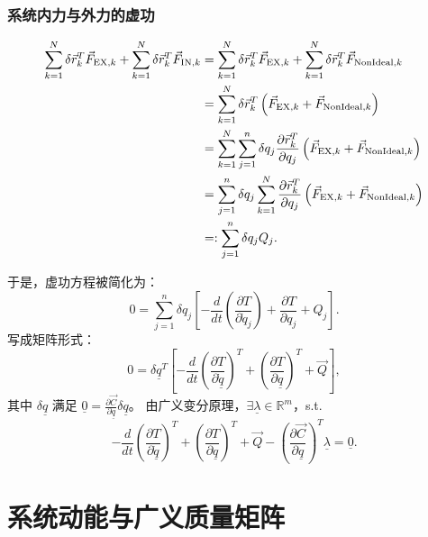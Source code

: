 \subsubsection{系统内力与外力的虚功}
\[
\begin{aligned}
\sum_{k=1}^N \delta \vec{r}_k^T \vec{F}_{{\rm EX},k} + \sum_{k=1}^N \delta \vec{r}_k^T \vec{F}_{{\rm IN},k}
&= \sum_{k=1}^N \delta \vec{r}_k^T \vec{F}_{{\rm EX},k} + \sum_{k=1}^N \delta \vec{r}_k^T \vec{F}_{{\rm NonIdeal},k} \\
&= \sum_{k=1}^N \delta \vec{r}_k^T \left( \vec{F}_{{\rm EX},k} + \vec{F}_{{\rm NonIdeal},k} \right) \\
&= \sum_{k=1}^N \sum_{j=1}^n \delta q_j \frac{\partial \vec{r}_k^T}{\partial q_j} \left( \vec{F}_{{\rm EX},k} + \vec{F}_{{\rm NonIdeal},k} \right) \\
&= \sum_{j=1}^n \delta q_j \sum_{k=1}^N \frac{\partial \vec{r}_k^T}{\partial q_j} \left( \vec{F}_{{\rm EX},k} + \vec{F}_{{\rm NonIdeal},k} \right) \\
&=: \sum_{j=1}^n \delta q_j Q_j.
\end{aligned}
\]

于是，虚功方程被简化为：
\[
0 = \sum_{j=1}^n \delta q_j \left[ -\frac{d}{dt}\left( \frac{\partial T}{\partial \dot{q}_j} \right) + \frac{\partial T}{\partial q_j} + Q_j \right].
\]
写成矩阵形式：
\[
0 = \delta \underline{q}^T \left[ -\frac{d}{dt}\left( \frac{\partial T}{\partial \dot{\underline{q}}} \right)^T + \left( \frac{\partial T}{\partial \underline{q}} \right)^T + \vec{Q} \right],
\]
其中 \( \delta \underline{q} \) 满足 \( \underline{0} = \frac{\partial \vec{C}}{\partial \underline{q}} \delta \underline{q} \)。
由广义变分原理，\( \exists \underline{\lambda} \in \mathbb{R}^m \)，s.t.
\[
-\frac{d}{dt}\left( \frac{\partial T}{\partial \dot{\underline{q}}} \right)^T + \left( \frac{\partial T}{\partial \underline{q}} \right)^T + \vec{Q} - \left( \frac{\partial \vec{C}}{\partial \underline{q}} \right)^T \underline{\lambda} = \underline{0}.
\]

\section{系统动能与广义质量矩阵}
